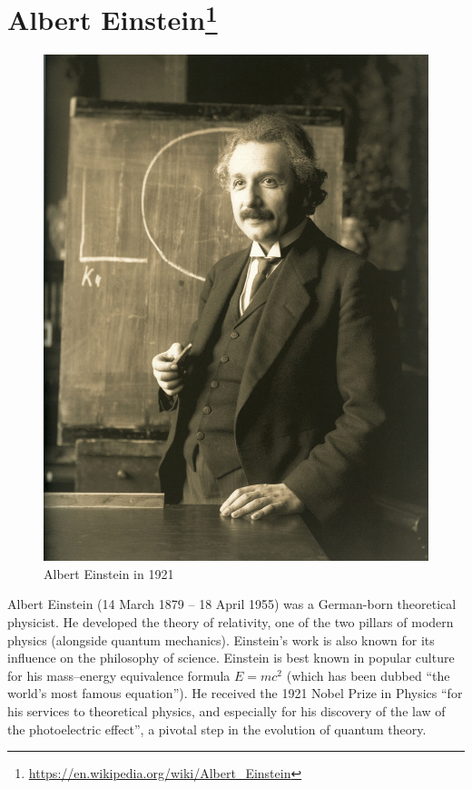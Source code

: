 \section*{Albert Einstein\protect\footnote{\url{https://en.wikipedia.org/wiki/Albert_Einstein}}}

\begin{figure}[ht]
  \centering
  \includegraphics[width=0.8\linewidth]{content/figures/albert_einstein_picuture.jpg}
  \caption{Albert Einstein in 1921\protect\footnotemark}
\end{figure}

Albert Einstein (14 March 1879 – 18 April 1955) was a German-born theoretical physicist. He developed the theory of relativity, one of the two pillars of modern physics (alongside quantum mechanics). Einstein's work is also known for its influence on the philosophy of science. Einstein is best known in popular culture for his mass–energy equivalence formula $E = mc^2$ (which has been dubbed ``the world's most famous equation''). He received the 1921 Nobel Prize in Physics ``for his services to theoretical physics, and especially for his discovery of the law of the photoelectric effect'', a pivotal step in the evolution of quantum theory.

